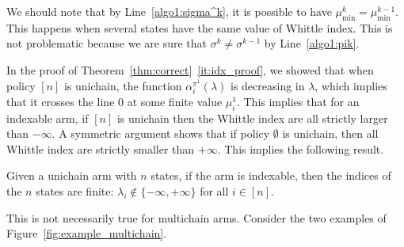 We should note that by Line~\ref{algo1:sigma^k}, it is possible to have $\mu^k_{\min}=\mu^{k-1}_{\min}$.
This happens when several states have the same value of Whittle index.
This is not problematic because we are sure that $\sigma^k\neq\sigma^{k-1}$ by Line~\ref{algo1:pik}.

In the proof of Theorem~\ref{thm:correct}~\ref{it:idx_proof}, we showed that when policy $[n]$ is unichain, the function $\alpha^{\pi^1}_{i}(\lambda)$ is decreasing in $\lambda$, which implies that it crosses the line $0$ at some finite value $\mu^1_{i}$. This implies that for an indexable arm, if $[n]$ is unichain then the Whittle index are all strictly larger than $-\infty$. A symmetric argument shows that if policy $\emptyset$ is unichain, then all Whittle index are strictly smaller than $+\infty$. This implies the following result. 
\begin{cor}
    Given a unichain arm with $n$ states, if the arm is indexable, then the indices of the $n$ states are finite: $\lambda_i\not\in\{-\infty,+\infty\}$ for all $i\in[n]$.
\end{cor}

This is not necessarily true for multichain arms.
Consider the two examples of Figure~\ref{fig:example_multichain}.

